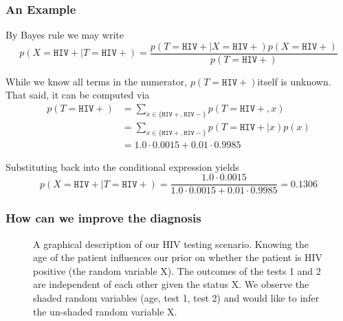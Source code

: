 \documentclass[notheorems, aspectratio=54]{beamer}
\begin{document}
\begin{frame}
    \frametitle{An Example}

    By Bayes rule we may write
    $$
    p(X = \mathtt{HIV+}|T=\mathtt{HIV+}) = \frac{p(T=\mathtt{HIV+}|X=\mathtt{HIV+})p(X=\mathtt{HIV+})}{p(T=\mathtt{HIV+})}
    $$

    While we know all terms in the numerator, $p(T = \mathtt{HIV+})$itself is unknown. That said, it can be computed via
    \begin{align}
    \nonumber p(T=\mathtt{HIV+}) &= \sum_{x \in \{\mathtt{HIV+}, \mathtt{HIV-}\}}p(T=\mathtt{HIV+},x) \\
    \nonumber &= \sum_{x \in \{\mathtt{HIV+}, \mathtt{HIV-}\}}p(T=\mathtt{HIV+}|x)p(x) \\
    \nonumber &= 1.0 \cdot 0.0015 + 0.01 \cdot 0.9985
    \end{align}

    Substituting back into the conditional expression yields
    $$
    p(X = \mathtt{HIV+}|T=\mathtt{HIV+}) = \frac{1.0 \cdot 0.0015}{1.0 \cdot 0.0015 + 0.01 \cdot 0.9985} = 0.1306
    $$

\end{frame}


\begin{frame}
    \frametitle{How can we improve the diagnosis}


    \center

    \begin{figure}
        \caption{A graphical description of our HIV testing scenario. Knowing the age of the patient influences our prior on whether the patient is HIV positive (the random variable X). The outcomes of the tests 1 and 2 are independent of each other given the status X. We observe the shaded random variables (age, test 1, test 2) and would like to infer the un-shaded random variable X.}
    \end{figure}

\end{frame}
\end{document}
